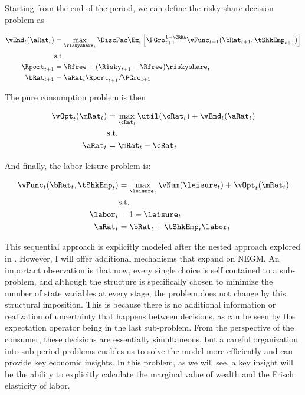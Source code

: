 \documentclass[\econtexRoot/EGMN]{subfiles}
\begin{document}
Starting from the end of the period, we can define the risky share decision problem as

\begin{equation}
  \begin{split}
    \vEnd_{t}(\aRat_{t}) & = \max_{\riskyshare_{t}} \DiscFac
    \Ex_{t} \left[ \PGro_{t+1}^{1-\CRRA}
      \vFunc_{t+1}(\bRat_{t+1},
      \tShkEmp_{t+1}) \right] \\
    & \text{s.t.} \\
    \Rport_{t+1} & = \Rfree + (\Risky_{t+1} - \Rfree)
    \riskyshare_{t} \\
    \bRat_{t+1} & = \aRat_{t} \Rport_{t+1} / \PGro_{t+1}
  \end{split}
\end{equation}

The pure consumption problem is then

\begin{equation}
  \begin{split}
    \vOpt_{t}(\mRat_{t}) & = \max_{\cRat_{t}} \util(\cRat_{t}) + \vEnd_{t}(\aRat_{t}) \\
    & \text{s.t.} \\
    \aRat_{t} & = \mRat_{t} - \cRat_{t}
  \end{split}
\end{equation}

And finally, the labor-leisure problem is:

\begin{equation}
  \begin{split}
    \vFunc_{t}(\bRat_{t}, \tShkEmp_{t}) & = \max_{ \leisure_{t}}
    \vNum(\leisure_{t}) + \vOpt_{t} (\mRat_{t}) \\
    & \text{s.t.} \\
    \labor_{t} & = 1 - \leisure_{t} \\
    \mRat_{t} & = \bRat_{t} + \tShkEmp_{t}\labor_{t} \\
  \end{split}
\end{equation}

This sequential approach is explicitly modeled after the nested approach explored in \cite{Druedahl2021-wl}. However, I will offer additional mechanisms that expand on NEGM. An important observation is that now, every single choice is self contained to a sub-problem, and although the structure is specifically chosen to minimize the number of state variables at every stage, the problem does not change by this structural imposition. This is because there is no additional information or realization of uncertainty that happens between decisions, as can be seen by the expectation operator being in the last sub-problem. From the perspective of the consumer, these decisions are essentially simultaneous, but a careful organization into sub-period problems enables us to solve the model more efficiently and can provide key economic insights. In this problem, as we will see, a key insight will be the ability to explicitly calculate the marginal value of wealth and the Frisch elasticity of labor.
\end{document}

